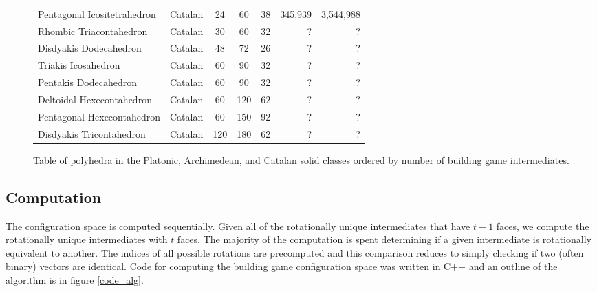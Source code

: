 \documentclass[12pt]{article}
\begin{document}
\begin{figure}[h]
{\begin{tabular}{ l | c | c | c | c || r | r }
Pentagonal Icositetrahedron & Catalan & 24 & 60 & 38 & 345,939 & 3,544,988 \\
Rhombic Triacontahedron &Catalan & 30 & 60 & 32 & ? & ? \\
Disdyakis Dodecahedron & Catalan & 48 & 72 & 26 & ? & ? \\
Triakis Icosahedron & Catalan & 60 & 90 & 32 & ? & ? \\
Pentakis Dodecahedron & Catalan & 60 & 90 & 32 & ? & ? \\
Deltoidal Hexecontahedron & Catalan & 60 & 120 & 62 & ? & ? \\
Pentagonal Hexecontahedron & Catalan & 60 & 150 & 92 & ? & ? \\
Disdyakis Tricontahedron & Catalan & 120 & 180 & 62 & ? & ? \\
  \hline  
\end{tabular}
}
\caption{Table of polyhedra in the Platonic, Archimedean, and Catalan solid classes ordered by number of building game intermediates.}
\label{fig:bgtable}
\end{figure}


\subsection{Computation}

The configuration space is computed sequentially. Given all of the rotationally unique intermediates that have $t-1$ faces, we compute the rotationally unique intermediates with $t$ faces. The majority of the computation is spent determining if a given intermediate is rotationally equivalent to another. The indices of all possible rotations are precomputed and this comparison reduces to simply checking if two (often binary) vectors are identical. Code for computing the building game configuration space was written in C++ and an outline of the algorithm is in figure \ref{code_alg}.
\end{document}
